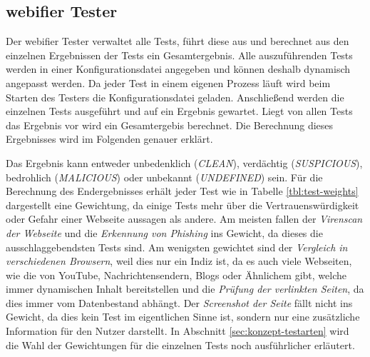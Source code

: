 \subsection{webifier Tester}
\label{sec:konzept-tester}

Der webifier Tester verwaltet alle Tests, führt diese aus und berechnet aus den einzelnen Ergebnissen der Tests ein Gesamtergebnis. Alle auszuführenden Tests werden in einer Konfigurationsdatei angegeben und können deshalb dynamisch angepasst werden. Da jeder Test in einem eigenen Prozess läuft wird beim Starten des Testers die Konfigurationsdatei geladen. Anschließend werden die einzelnen Tests ausgeführt und auf ein Ergebnis gewartet. Liegt von allen Tests das Ergebnis vor wird ein Gesamtergebis berechnet. Die Berechnung dieses Ergebnisses wird im Folgenden genauer erklärt.

Das Ergebnis kann entweder unbedenklich (\textit{CLEAN}), verdächtig (\textit{SUSPICIOUS}), bedrohlich (\textit{MALICIOUS}) oder unbekannt (\textit{UNDEFINED}) sein. Für die Berechnung des Endergebnisses erhält jeder Test wie in Tabelle \ref{tbl:test-weights} dargestellt eine Gewichtung, da einige Tests mehr über die Vertrauenswürdigkeit oder Gefahr einer Webseite aussagen als andere. Am meisten fallen der \textit{Virenscan der Webseite} und die \textit{Erkennung von Phishing} ins Gewicht, da dieses die ausschlaggebendsten Tests sind. Am wenigsten gewichtet sind der \textit{Vergleich in verschiedenen Browsern}, weil dies nur ein Indiz ist, da es auch viele Webseiten, wie die von YouTube, Nachrichtensendern, Blogs oder Ähnlichem gibt, welche immer dynamischen Inhalt bereitstellen und die \textit{Prüfung der verlinkten Seiten}, da dies immer vom Datenbestand abhängt. Der \textit{Screenshot der Seite} fällt nicht ins Gewicht, da dies kein Test im eigentlichen Sinne ist, sondern nur eine zusätzliche Information für den Nutzer darstellt. In Abschnitt \ref{sec:konzept-testarten} wird die Wahl der Gewichtungen für die einzelnen Tests noch ausführlicher erläutert.

